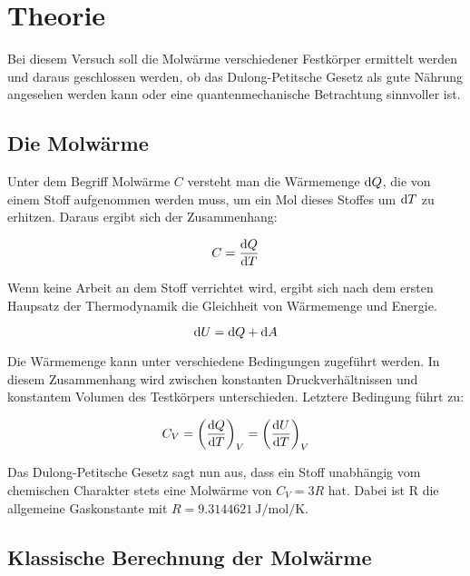 \section{Theorie}
\label{sec:Theorie}

Bei diesem Versuch soll die Molwärme verschiedener Festkörper
ermittelt werden und daraus geschlossen werden, ob das 
Dulong-Petitsche Gesetz als gute Nährung angesehen werden kann
oder eine quantenmechanische Betrachtung sinnvoller ist. 

\subsection{Die Molwärme}
\label{sec:Molwaerme}

Unter dem Begriff Molwärme $C$ versteht man die Wärmemenge $\mathop{}\!\mathrm{d} Q$, 
die von einem Stoff aufgenommen werden muss, um ein Mol 
dieses Stoffes um $\mathop{}\!\mathrm{d} T$ zu erhitzen. Daraus ergibt sich der 
Zusammenhang:

\begin{equation*}
C = \frac{\mathop{}\!\mathrm{d} Q}{\mathop{}\!\mathrm{d} T}
\end{equation*}

Wenn keine Arbeit an dem Stoff verrichtet wird, ergibt sich
nach dem ersten Haupsatz der Thermodynamik die Gleichheit 
von Wärmemenge und Energie. 

\begin{equation*}
\mathop{}\!\mathrm{d} U = \mathop{}\!\mathrm{d} Q + \mathop{}\!\mathrm{d} A
\end{equation*}

Die Wärmemenge kann unter verschiedene Bedingungen zugeführt 
werden. In diesem Zusammenhang wird zwischen konstanten 
Druckverhältnissen und konstantem Volumen des Testkörpers 
unterschieden. Letztere Bedingung führt zu: 

\begin{equation}
C_V = \left(\frac{\mathop{}\!\mathrm{d} Q}{\mathop{}\!\mathrm{d} T}\right)_V = \left(\frac{\mathop{}\!\mathrm{d} U}{\mathop{}\!\mathrm{d} T}\right)_V
\label{eqn:Molwaerme}
\end{equation}

Das Dulong-Petitsche Gesetz sagt nun aus, dass ein Stoff 
unabhängig vom chemischen Charakter stets eine Molwärme von
$C_V = 3 R$ hat. Dabei ist R die allgemeine Gaskonstante mit 
$R = \SI{9.3144621}{\joule\per\mol\per\kelvin}$.

\subsection{Klassische Berechnung der Molwärme}
\label{sec:Klassisch}

